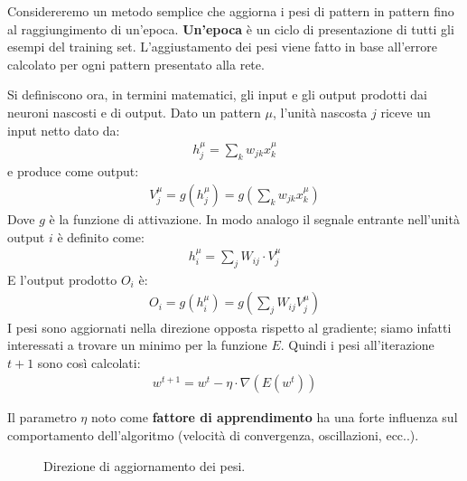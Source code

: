 Considereremo un metodo semplice che aggiorna i pesi di pattern in pattern fino al raggiungimento di un'epoca. \textbf{Un'epoca} è un ciclo di presentazione di tutti gli esempi del training set.
L'aggiustamento dei pesi viene fatto in base all'errore calcolato per ogni pattern presentato alla rete.
\newpage

Si definiscono ora, in termini matematici, gli input e gli output prodotti dai neuroni nascosti e di output.
Dato un pattern $\mu$, l'unità nascosta $j$ riceve un input netto dato da:
\begin{align}
	h_j^\mu = \sum_k w_{jk} x^\mu_k
\end{align}
e produce come output:
\begin{align}
	V_j^\mu = g(h_j^\mu) = g\left(\sum_k w_{jk} x^\mu_k \right)
\end{align}
Dove $g$ è la funzione di attivazione. In modo analogo il segnale entrante nell'unità output $i$ è definito come:
\begin{align}
	h_i^\mu = \sum_j W_{ij} \cdot V^\mu_j
\end{align}
E l'output prodotto $O_i$ è:
\begin{align}
	O_i = g(h^\mu_i) = g\left(\sum_j W_{ij} V^\mu_j \right)
	\end{align} 
	I pesi sono aggiornati nella direzione opposta rispetto al gradiente; siamo infatti interessati a trovare un minimo per la funzione $E$. Quindi i pesi all'iterazione $t + 1$ sono così calcolati:
	\begin{align*}
		w^{t+1} = w^t - \eta \cdot \nabla (E(w^t))
	\end{align*}


	Il parametro $\eta$ noto come \textbf{fattore di apprendimento} ha una forte influenza sul comportamento dell'algoritmo (velocità di convergenza, oscillazioni, ecc..).

	\begin{figure}[h!]
		\centering
		\caption{Direzione di aggiornamento dei pesi.}
	\end{figure}


